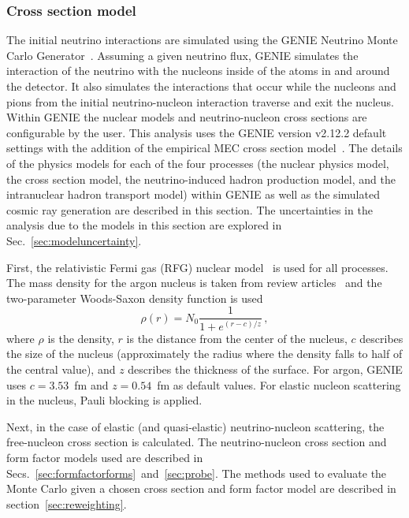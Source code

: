   \subsubsection{Cross section model}\label{sec:geniexsec}
    The initial neutrino interactions are simulated using the GENIE Neutrino
    Monte Carlo Generator~\cite{Andreopoulos:2009rq,Andreopoulos:2015wxa}.
    Assuming a given neutrino flux, GENIE simulates the interaction of the
    neutrino with the nucleons inside of the atoms in and around the detector.
    It also simulates the interactions that occur while the nucleons and pions
    from the initial neutrino-nucleon interaction traverse and exit the
    nucleus. Within GENIE the nuclear models and neutrino-nucleon cross
    sections are configurable by the user. This analysis uses the GENIE version
    v2.12.2 default settings with the addition of the empirical MEC cross
    section model~\cite{Alam:2015nkk}. The details of the physics models for
    each of the four processes (the nuclear physics model, the cross section
    model, the neutrino-induced hadron production model, and the
    intranuclear hadron transport model) within GENIE as well as the
    simulated cosmic ray generation are described in this section. The
    uncertainties in the analysis due to the models in this section are
    explored in Sec.~\ref{sec:modeluncertainty}.

    First, the relativistic Fermi gas (RFG) nuclear model~\cite{Smith:1972xh}
    is used for all processes. The mass density for the argon nucleus is taken
    from review articles~\cite{DeJager:1987qc} and the two-parameter
    Woods-Saxon density function is used~\cite{Woods:1954zz}
    \begin{equation}\label{eq:woodssaxon}
      \rho(r) = N_0\frac{1}{1+e^{(r-c)/z}} \,,
    \end{equation}
    where $\rho$ is the density, $r$ is the distance from the center of the
    nucleus, $c$ describes the size of the nucleus (approximately the radius
    where the density falls to half of the central value), and $z$ describes
    the thickness of the surface. For argon, GENIE uses $c=3.53$~fm and
    $z=0.54$~fm as default values.  For elastic nucleon scattering in the
    nucleus, Pauli blocking is applied.
    
    Next, in the case of elastic (and quasi-elastic) neutrino-nucleon
    scattering, the free-nucleon cross section is calculated. The
    neutrino-nucleon cross section and form factor models used are described in
    Secs.~\ref{sec:formfactorforms}~and~\ref{sec:probe}. The methods used to
    evaluate the Monte Carlo given a chosen cross section and form factor
    model are described in section~\ref{sec:reweighting}.

